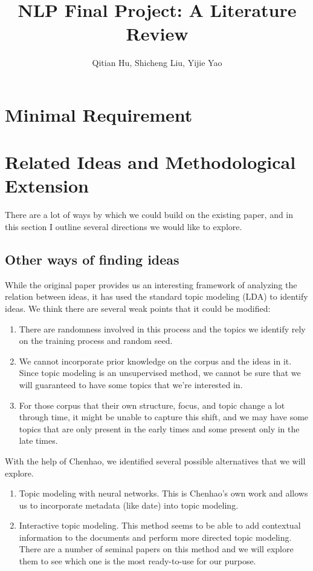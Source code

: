 \documentclass{article}
\title{NLP Final Project: A Literature Review}
\author{Qitian Hu, Shicheng Liu, Yijie Yao}
\begin{document}
\maketitle 

\section{Minimal Requirement}


\section{Related Ideas and Methodological Extension}


There are a lot of ways by which we could build on the existing paper, and in this section I outline several directions we would like to explore.

\subsection{Other ways of finding ideas}

While the original paper provides us an interesting framework of analyzing the relation between ideas, it has used the standard topic modeling (LDA) to identify ideas. We think there are several weak points that it could be modified:

\begin{enumerate}
  \item There are randomness involved in this process and the topics we identify rely on the training process and random seed.
  \item We cannot incorporate prior knowledge on the corpus and the ideas in it. Since topic modeling is an unsupervised method, we cannot be sure that we will guaranteed to have some topics that we're interested in. 
  \item For those corpus that their own structure, focus, and topic change a lot through time, it might be unable to capture this shift, and we may have some topics that are only present in the early times and some present only in the late times.
\end{enumerate}

With the help of Chenhao, we identified several possible alternatives that we will explore.

\begin{enumerate}
  \item Topic modeling with neural networks. This is Chenhao's own work and allows us to incorporate metadata (like date) into topic modeling. \cite{chenhao}
  \item Interactive topic modeling. \cite{interactive} This method seems to be able to add contextual information to the documents and perform more directed topic modeling. There are a number of seminal papers on this method and we will explore them to see which one is the most ready-to-use for our purpose. \cite{interactivec} \cite{interactiveb}
\end{enumerate}  
\end{document}
